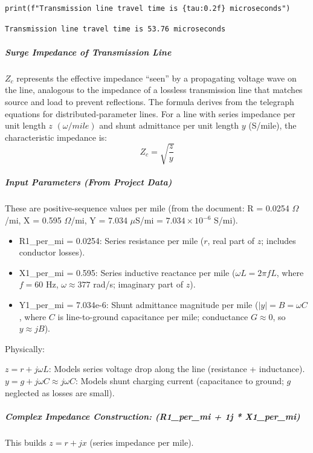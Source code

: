 \begin{verbatim}
print(f"Transmission line travel time is {tau:0.2f} microseconds")
\end{verbatim}

\begin{verbatim}
Transmission line travel time is 53.76 microseconds
\end{verbatim}

\subparagraph{Surge Impedance of Transmission Line}

$Z_c$ represents the effective impedance ``seen'' by a propagating voltage wave on the line, analogous to the impedance of a lossless transmission line that matches source and load to prevent reflections.  The formula derives from the telegraph equations for distributed-parameter lines.  For a line with series impedance per unit length $z$ $(\omega/mile)$ and shunt admittance per unit length $y$ (S/mile), the characteristic impedance is:
\begin{equation}
Z_c = \sqrt{\frac{z}{y}}
\end{equation}

\subparagraph{Input Parameters (From Project Data)}

These are positive-sequence values per mile (from the document: R = 0.0254 $\Omega$/mi, X = 0.595 $\Omega$/mi, Y = 7.034 $\mu$S/mi = $7.034 \times 10^{ -6}$ S/mi).

\begin{itemize}
\item R1\_per\_mi = 0.0254: Series resistance per mile ($r$, real part of $z$; includes conductor losses).
\item X1\_per\_mi = 0.595: Series inductive reactance per mile ($\omega L = 2\pi f L$, where $f = 60$ Hz, $\omega \approx 377$ rad/s; imaginary part of $z$).
\item Y1\_per\_mi = 7.034e-6: Shunt admittance magnitude per mile ($|y| = B = \omega C$, where $C$ is line-to-ground capacitance per mile; conductance $G \approx 0$, so $y \approx j B$).
\end{itemize}

Physically:

$z = r + j \omega L$: Models series voltage drop along the line (resistance + inductance).
$y = g + j \omega C \approx j \omega C$: Models shunt charging current (capacitance to ground; $g$ neglected as losses are small).

\subparagraph{Complex Impedance Construction: (R1\_per\_mi + 1j * X1\_per\_mi)}

This builds $z = r + j x$ (series impedance per mile).  \newline

